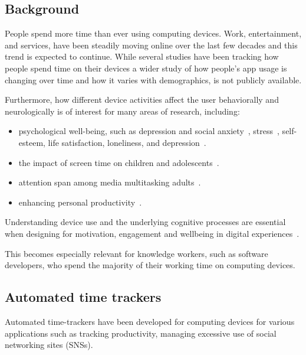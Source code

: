 \documentclass{IEEEtran}
\begin{document}
\begin{refsection}
\section{Background}

People spend more time than ever using computing devices. Work, entertainment, and services, have been steadily moving online over the last few decades and this trend is expected to continue.
While several studies have been tracking how people spend time on their devices a wider study of how people's app usage is changing over time and how it varies with demographics, is not publicly available.

Furthermore, how different device activities affect the user behaviorally and neurologically is of interest for many areas of research, including:

\begin{itemize}
    \item psychological well-being, such as depression and social anxiety~\cite{selfhout_different_2009}\cite{shah_nonrecursive_2002}, stress~\cite{mark_stress_2014}, self-esteem, life satisfaction, loneliness, and depression~\cite{huang_time_2017}.
    \item the impact of screen time on children and adolescents~\cite{subrahmanyam_impact_2001}.
    \item attention span among media multitasking adults~\cite{mark_stress_2014}.
    \item enhancing personal productivity~\cite{kim_timeaware_2016}.
\end{itemize}

Understanding device use and the underlying cognitive processes are essential when designing for motivation, engagement and wellbeing in digital experiences~\cite{peters_designing_2018}.

This becomes especially relevant for knowledge workers, such as software developers, who spend the majority of their working time on computing devices.


\subsection{Automated time trackers}

Automated time-trackers have been developed for computing devices for various applications such as tracking productivity, managing excessive use of social networking sites (SNSs).


\end{refsection}
\end{document}
